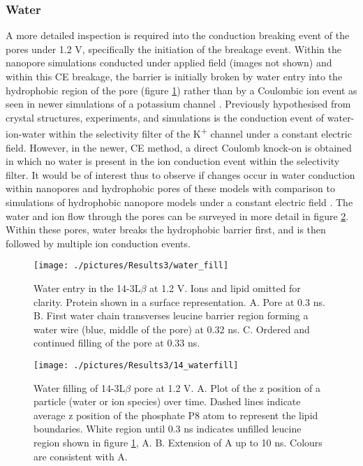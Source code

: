 \subsubsection{Water}

A more detailed inspection is required into the conduction breaking event of the pores under 1.2 V, specifically the initiation of the breakage event. Within the nanopore simulations conducted under applied field (images not shown) and within this CE breakage, the barrier is initially broken by water entry into the hydrophobic region of the pore (figure \ref{fig:water_fill}) rather than by a Coulombic ion event as seen in newer simulations of a potassium channel \cite{Kopfer2014a}. Previously hypothesised from crystal structures, experiments, and simulations \cite{Zhou2003,Domene2003,Miller2001,Morais-Cabral2001} is the conduction event of water-ion-water within the selectivity filter of the K\textsuperscript{+} channel under a constant electric field. However, in the newer, CE method, a direct Coulomb knock-on is obtained in which no water is present in the ion conduction event within the selectivity filter. It would be of interest thus to observe if changes occur in water conduction within nanopores and hydrophobic pores of these models with comparison to simulations of hydrophobic nanopore models under a constant electric field \cite{Dzubiella2005}.  The water and ion flow through the pores can be surveyed in more detail in figure \ref{fig:14_waterfill}. Within these pores, water breaks the hydrophobic barrier first, and is then followed by multiple ion conduction events.

\begin{figure}[H]
\begin{center}
\texttt{[image: ./pictures/Results3/water\_fill]}
\caption[Water entry in the 14-3L$\beta$ at 1.2 V.] {Water entry in the 14-3L$\beta$ at 1.2 V. Ions and lipid omitted for clarity. Protein shown in a surface representation. A. Pore at 0.3 ns. B. First water chain transverses leucine barrier region forming a water wire (blue, middle of the pore) at 0.32 ns. C. Ordered and continued filling of the pore at 0.33 ns.}
\label{fig:water_fill}
\end{center}
\end{figure}

\begin{figure}[H]
\begin{center}
\texttt{[image: ./pictures/Results3/14\_waterfill]}
\caption[Water filling of 14-3L$\beta$ pore at 1.2 V.] {Water filling of 14-3L$\beta$ pore at 1.2 V. A. Plot of the z position of a particle (water or ion species) over time. Dashed lines indicate average z position of the phosphate P8 atom to represent the lipid boundaries. White region until 0.3 ns indicates unfilled leucine region shown in figure \ref{fig:water_fill}, A.  B. Extension of A up to 10 ns. Colours are consistent with A.}
\label{fig:14_waterfill}
\end{center}
\end{figure}

